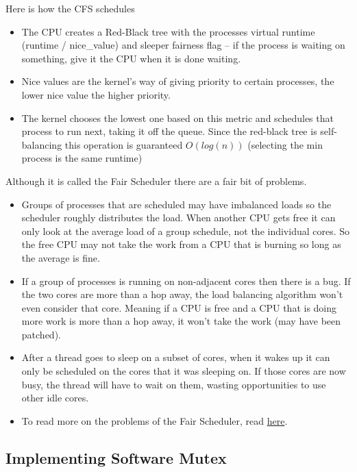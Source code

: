 Here is how the CFS schedules

\begin{itemize}
\tightlist
\item
  The CPU creates a Red-Black tree with the processes virtual runtime (runtime / nice\_value) and sleeper fairness flag -- if the process is waiting on something, give it the CPU when it is done waiting.
\item
  Nice values are the kernel's way of giving priority to certain processes, the lower nice value the higher priority.
\item
  The kernel chooses the lowest one based on this metric and schedules that process to run next, taking it off the queue. Since the red-black tree is self-balancing this operation is guaranteed \(O(log(n))\) (selecting the min process is the same runtime)
\end{itemize}

Although it is called the Fair Scheduler there are a fair bit of problems.

\begin{itemize}
\tightlist
\item
  Groups of processes that are scheduled may have imbalanced loads so the scheduler roughly distributes the load. When another CPU gets free it can only look at the average load of a group schedule, not the individual cores. So the free CPU may not take the work from a CPU that is burning so long as the average is fine.
\item
  If a group of processes is running on non-adjacent cores then there is a bug. If the two cores are more than a hop away, the load balancing algorithm won't even consider that core. Meaning if a CPU is free and a CPU that is doing more work is more than a hop away, it won't take the work (may have been patched).
\item
  After a thread goes to sleep on a subset of cores, when it wakes up it can only be scheduled on the cores that it was sleeping on. If those cores are now busy, the thread will have to wait on them, wasting opportunities to use other idle cores.
\item
  To read more on the problems of the Fair Scheduler, read \href{https://blog.acolyer.org/2016/04/26/the-linux-scheduler-a-decade-of-wasted-cores}{here}.
\end{itemize}


\subsection{Implementing Software Mutex}

